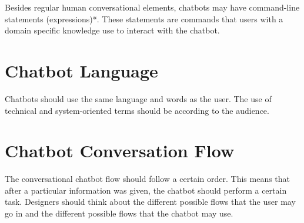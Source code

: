 \documentclass[a4paper,10pt]{article}
\begin{document}
 Besides regular human conversational elements, chatbots may have command-line statements (expressions)*. These statements are commands that users with a domain specific knowledge use to interact with the chatbot.
 
 \section{Chatbot Language}
 
 Chatbots should use the same language and words as the user. The use of technical and system-oriented terms should be according to the audience. 

\section{Chatbot Conversation Flow}

The conversational chatbot flow should follow a certain order. This means that after a particular information was given, the chatbot should perform a certain task. Designers should think about the different possible flows that the user may go in and the different possible flows that the chatbot may use.  


\medskip


\end{document}
